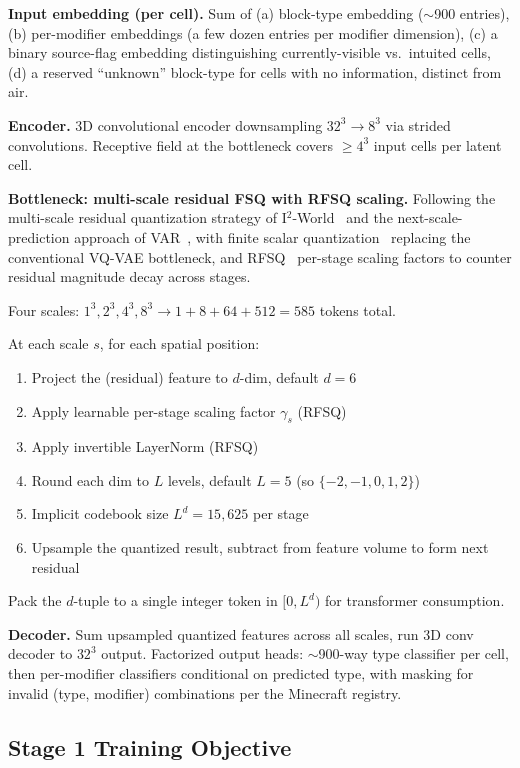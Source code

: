 \documentclass[11pt,a4paper]{article}
\begin{document}
\textbf{Input embedding (per cell).} Sum of (a) block-type embedding ($\sim$900 entries), (b) per-modifier embeddings (a few dozen entries per modifier dimension), (c) a binary source-flag embedding distinguishing currently-visible vs.\ intuited cells, (d) a reserved ``unknown'' block-type for cells with no information, distinct from air.

\textbf{Encoder.} 3D convolutional encoder downsampling $32^3 \to 8^3$ via strided convolutions. Receptive field at the bottleneck covers $\geq 4^3$ input cells per latent cell.

\textbf{Bottleneck: multi-scale residual FSQ with RFSQ scaling.} Following the multi-scale residual quantization strategy of I$^2$-World~\cite{i2world} and the next-scale-prediction approach of VAR~\cite{var}, with finite scalar quantization~\cite{fsq} replacing the conventional VQ-VAE bottleneck, and RFSQ~\cite{rfsq} per-stage scaling factors to counter residual magnitude decay across stages.

Four scales: $1^3, 2^3, 4^3, 8^3 \to 1+8+64+512 = 585$ tokens total.

At each scale $s$, for each spatial position:
\begin{enumerate}
  \item Project the (residual) feature to $d$-dim, default $d=6$
  \item Apply learnable per-stage scaling factor $\gamma_s$ (RFSQ)
  \item Apply invertible LayerNorm (RFSQ)
  \item Round each dim to $L$ levels, default $L=5$ (so $\{-2,-1,0,1,2\}$)
  \item Implicit codebook size $L^d = 15{,}625$ per stage
  \item Upsample the quantized result, subtract from feature volume to form next residual
\end{enumerate}

Pack the $d$-tuple to a single integer token in $[0, L^d)$ for transformer consumption.

\textbf{Decoder.} Sum upsampled quantized features across all scales, run 3D conv decoder to $32^3$ output. Factorized output heads: $\sim$900-way type classifier per cell, then per-modifier classifiers conditional on predicted type, with masking for invalid (type, modifier) combinations per the Minecraft registry.

\subsection{Stage 1 Training Objective}
\end{document}
